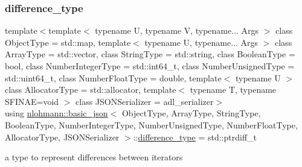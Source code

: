 \subsubsection{\texorpdfstring{difference\_type}{difference\_type}}
{\footnotesize\ttfamily template$<$template$<$ typename U, typename V, typename... Args $>$ class Object\+Type = std\+::map, template$<$ typename U, typename... Args $>$ class Array\+Type = std\+::vector, class String\+Type  = std\+::string, class Boolean\+Type  = bool, class Number\+Integer\+Type  = std\+::int64\+\_\+t, class Number\+Unsigned\+Type  = std\+::uint64\+\_\+t, class Number\+Float\+Type  = double, template$<$ typename U $>$ class Allocator\+Type = std\+::allocator, template$<$ typename T, typename S\+F\+I\+N\+A\+E=void $>$ class J\+S\+O\+N\+Serializer = adl\+\_\+serializer$>$ \\
using \mbox{\hyperlink{classnlohmann_1_1basic__json}{nlohmann\+::basic\+\_\+json}}$<$ Object\+Type, Array\+Type, String\+Type, Boolean\+Type, Number\+Integer\+Type, Number\+Unsigned\+Type, Number\+Float\+Type, Allocator\+Type, J\+S\+O\+N\+Serializer $>$\+::\mbox{\hyperlink{classnlohmann_1_1basic__json_afe7c1303357e19cea9527af4e9a31d8f}{difference\+\_\+type}} =  std\+::ptrdiff\+\_\+t}



a type to represent differences between iterators 

\mbox{\label{classnlohmann_1_1basic__json_a099316232c76c034030a38faa6e34dca}} 

